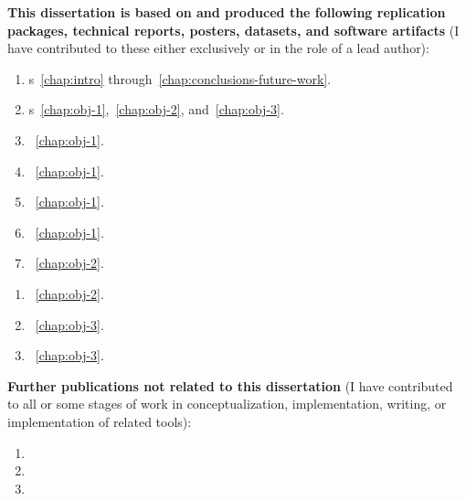 \newpage
\noindent\textbf{This dissertation is based on and produced the following replication packages, technical reports, posters, datasets, and software artifacts}
(I have contributed to these either exclusively or in the role of a lead author):


\begin{enumerate}[series=publ1,start=1,leftmargin=*]
    \item{}s~\ref{chap:intro} through~\ref{chap:conclusions-future-work}.
    \item{}s~\ref{chap:obj-1},~\ref{chap:obj-2}, and~\ref{chap:obj-3}.
    \item{}~\ref{chap:obj-1}.
    \item{}~\ref{chap:obj-1}.
    \item{}~\ref{chap:obj-1}.
    \item{}~\ref{chap:obj-1}.
    \item{}~\ref{chap:obj-2}.
\end{enumerate}
\clearpage
\begin{enumerate}[resume*=publ1]
    \item{}~\ref{chap:obj-2}.
    \item{}~\ref{chap:obj-3}.
    \item{}~\ref{chap:obj-3}.
\end{enumerate}


\bigskip
\bigskip
\noindent\textbf{Further publications not related to this dissertation}
(I have contributed to all
or some stages of work in conceptualization, implementation, writing, or implementation of related tools):

\begin{enumerate}
    \item{}
    \item{}
    \item{}
\end{enumerate}





\cleardoublepage
